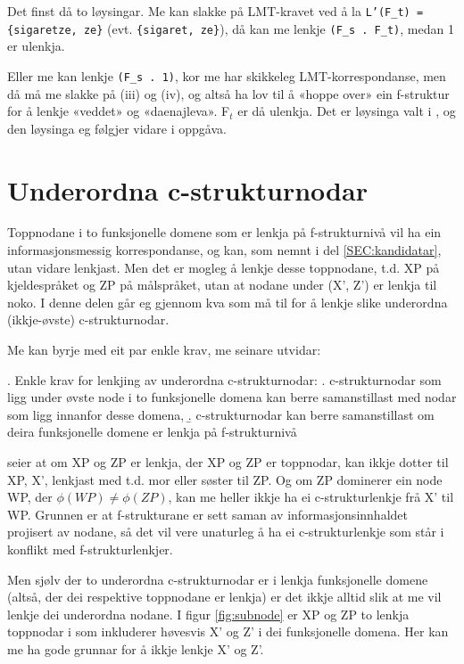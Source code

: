 \documentclass[11pt,a4paper,oneside,draft]{book}
\begin{document}
Det finst då to løysingar. Me kan slakke på LMT-kravet ved å la
\texttt{L'(F\_t) = \{sigaretze, ze\}} (evt. \texttt{\{sigaret, ze\}}), då kan me lenkje
\texttt{(F\_s . F\_t)}, medan 1 er ulenkja.

Eller me kan lenkje \texttt{(F\_s . 1)}, kor me har skikkeleg
LMT-korrespondanse, men då må me slakke på (iii) og (iv), og altså ha
lov til å «hoppe over» ein f-struktur for å lenkje «veddet» og
«daenajleva». F$_t$ er då ulenkja. Det er løysinga valt i
\citet[s.~75,~fotnote~3]{dyvik2009lmp}, og den løysinga eg følgjer
vidare i oppgåva.

\section{Underordna c-strukturnodar}
\label{sec-3.7}

\label{SEC:subnode}

Toppnodane i to funksjonelle domene som er lenkja på f-strukturnivå
vil ha ein informasjonsmessig korrespondanse, og kan, som nemnt i del
\ref{SEC:kandidatar}, utan vidare lenkjast. Men det er mogleg å lenkje
desse toppnodane, t.d. XP på kjeldespråket og ZP på målspråket, utan
at nodane under (X', Z') er lenkja til noko. I denne delen går eg
gjennom kva som må til for å lenkje slike underordna (ikkje-øvste)
c-strukturnodar.

Me kan byrje med eit par enkle krav, me seinare utvidar:

\ex. Enkle krav for lenkjing av underordna c-strukturnodar:
\a. \label{subnodekrav-innan-domene} c-strukturnodar som ligg under øvste node i to funksjonelle
    domena kan berre samanstillast med nodar som ligg innanfor desse
    domena,
\b. \label{subnodekrav-f-lenkja} c-strukturnodar kan berre samanstillast om deira funksjonelle
    domene er lenkja på f-strukturnivå

\Last[a] seier at om XP og ZP er lenkja, der XP og ZP er toppnodar,
kan ikkje dotter til XP, X', lenkjast med t.d. mor eller søster til
ZP. Og om ZP dominerer ein node WP, der $\phi(WP) \neq \phi(ZP)$, kan
me heller ikkje ha ei c-strukturlenkje frå X' til WP. Grunnen er at
f-strukturane er sett saman av informasjonsinnhaldet projisert av
nodane, så det vil vere unaturleg å ha ei c-strukturlenkje som står i
konflikt med f-strukturlenkjer.

Men sjølv der to underordna c-strukturnodar er i lenkja funksjonelle
domene (altså, der dei respektive toppnodane er lenkja) er det ikkje
alltid slik at me vil lenkje dei underordna nodane. I figur
\ref{fig:subnode} er XP og ZP to lenkja toppnodar i som inkluderer
høvesvis X' og Z' i dei funksjonelle domena. Her kan me ha gode
grunnar for å ikkje lenkje X' og Z'. 
\end{document}
